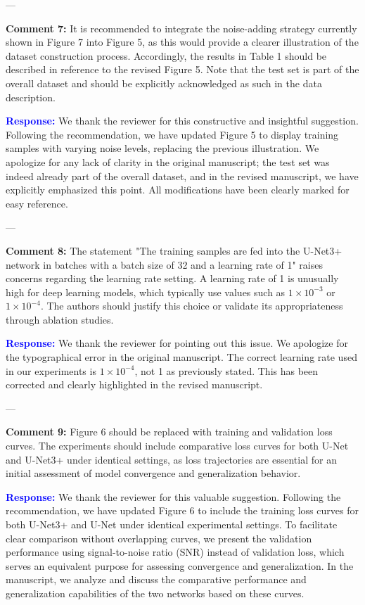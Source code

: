 \documentclass[12pt]{article}
\begin{document}
---

\textbf{Comment 7:}  
It is recommended to integrate the noise-adding strategy currently shown in Figure 7 into Figure 5, as this would provide a clearer illustration of the dataset construction process. Accordingly, the results in Table 1 should be described in reference to the revised Figure 5. Note that the test set is part of the overall dataset and should be explicitly acknowledged as such in the data description.

\textcolor{blue}{\textbf{Response:}} 
We thank the reviewer for this constructive and insightful suggestion. Following the recommendation, we have updated Figure 5 to display training samples with varying noise levels, replacing the previous illustration. We apologize for any lack of clarity in the original manuscript; the test set was indeed already part of the overall dataset, and in the revised manuscript, we have explicitly emphasized this point. All modifications have been clearly marked for easy reference.

---

\textbf{Comment 8:}  
The statement "The training samples are fed into the U-Net3+ network in batches with a batch size of 32 and a learning rate of 1" raises concerns regarding the learning rate setting. A learning rate of 1 is unusually high for deep learning models, which typically use values such as $1\times10^{-3}$ or $1\times10^{-4}$. The authors should justify this choice or validate its appropriateness through ablation studies.

\textcolor{blue}{\textbf{Response:}} 
We thank the reviewer for pointing out this issue. We apologize for the typographical error in the original manuscript. The correct learning rate used in our experiments is $1\times10^{-4}$, not 1 as previously stated. This has been corrected and clearly highlighted in the revised manuscript.

---

\textbf{Comment 9:}  
Figure 6 should be replaced with training and validation loss curves. The experiments should include comparative loss curves for both U-Net and U-Net3+ under identical settings, as loss trajectories are essential for an initial assessment of model convergence and generalization behavior.

\textcolor{blue}{\textbf{Response:}} 
We thank the reviewer for this valuable suggestion. Following the recommendation, we have updated Figure 6 to include the training loss curves for both U-Net3+ and U-Net under identical experimental settings. To facilitate clear comparison without overlapping curves, we present the validation performance using signal-to-noise ratio (SNR) instead of validation loss, which serves an equivalent purpose for assessing convergence and generalization. In the manuscript, we analyze and discuss the comparative performance and generalization capabilities of the two networks based on these curves.
\end{document}
